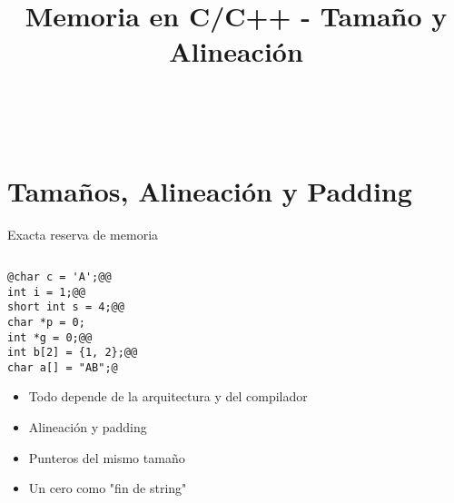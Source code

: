 

\title%
{Memoria en C/C++ - Tama\~no y Alineaci\'on}


\subject{Memoria en C/C++ - Tama\~no y Alineaci\'on}




\begin{frame}
   \titlepage
\end{frame}


~%
\section{Tama\~nos, Alineaci\'on y Padding}
\begin{frame}[fragile,label=RM]{Exacta reserva de memoria}
   \begin{columns}
      \begin{column}{.55\linewidth}
         \begin{lstlisting}[style=dimmided]
@char c = 'A';@@
int i = 1;@@
short int s = 4;@@
char *p = 0;
int *g = 0;@@
int b[2] = {1, 2};@@
char a[] = "AB";@
         \end{lstlisting}
   \begin{itemize}
      \item<1-> Todo depende de la arquitectura y del compilador
      \item<2-> Alineaci\'on y padding
      \item<4-> Punteros del mismo tama\~no
      \item<6-> Un cero como "fin de string"
   \end{itemize}

      \end{column}
      \begin{column}{.05\linewidth}
      \end{column}
      \begin{column}{.30\linewidth}
~%
         \begin{tikzpicture}[cell/.style={rectangle,draw=black},
            space/.style={minimum height=1.5em,matrix of nodes,row sep=-\pgflinewidth,column sep=-\pgflinewidth,column 1/.style={font=\ttfamily}},text depth=0.5ex,text height=2ex,nodes in empty cells]


\end{tikzpicture}
\end{column}
\end{columns}
\end{frame}
